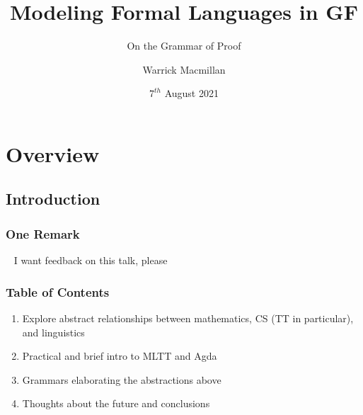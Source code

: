 \documentclass[9pt]{beamer}
\title{Modeling Formal Languages in GF}
\subtitle{On the Grammar of Proof}
\author{Warrick Macmillan}
\date{$7^{th}$ August 2021}
\begin{document}
\begin{frame}
  \titlepage
\end{frame}



\section{Overview}

\subsection{Introduction}

\begin{frame}
\frametitle{One Remark}

\begin{alertblock}{~}
I want feedback on this talk, please
\end{alertblock}

\end{frame}

\begin{frame}
\frametitle{Table of Contents}

\begin{enumerate}

\item Explore abstract relationships between mathematics, CS (TT in
  particular), and linguistics
\item Practical and brief intro to MLTT and Agda
\item Grammars elaborating the abstractions above
\item Thoughts about the future and conclusions
\end{enumerate}
\end{frame}
\end{document}
